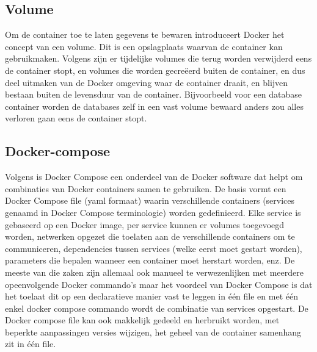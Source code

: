 \subsection{Volume}
Om de container toe te laten gegevens te bewaren introduceert Docker het concept van een volume. Dit is een opslagplaats waarvan de container kan gebruikmaken. Volgens  \textcite{Frieze2022} zijn er tijdelijke volumes die terug worden verwijderd eens de container stopt, en volumes die worden gecreëerd buiten de container, en dus deel uitmaken van de Docker omgeving waar de container draait, en blijven bestaan buiten de levensduur van de container.
\newline
Bijvoorbeeld voor een database container worden de databases zelf in een vast volume bewaard anders zou alles verloren gaan eens de container stopt.

\subsection{Docker-compose}
Volgens \textcite{Docker2023} is Docker Compose een onderdeel van de Docker software dat helpt om combinaties van Docker containers samen te gebruiken. De basis vormt een Docker Compose file (yaml formaat) waarin verschillende containers (services genaamd in Docker Compose terminologie) worden gedefinieerd. Elke service is gebaseerd op een Docker image, per service kunnen er volumes toegevoegd worden, netwerken opgezet die toelaten aan de verschillende containers om te communiceren, dependencies tussen services (welke eerst moet gestart worden), parameters die bepalen wanneer een container moet herstart worden, enz.
\newline
\newline
De meeste van die zaken zijn allemaal ook manueel te verwezenlijken met meerdere opeenvolgende Docker commando's maar het voordeel van Docker Compose is dat het toelaat dit op een declaratieve manier vast te leggen in één file en met één enkel docker compose commando wordt de combinatie van services opgestart. De Docker compose file kan ook makkelijk gedeeld en herbruikt worden, met beperkte aanpassingen versies wijzigen, het geheel van de container samenhang zit in \'e\'en file.
\newline
\newline

